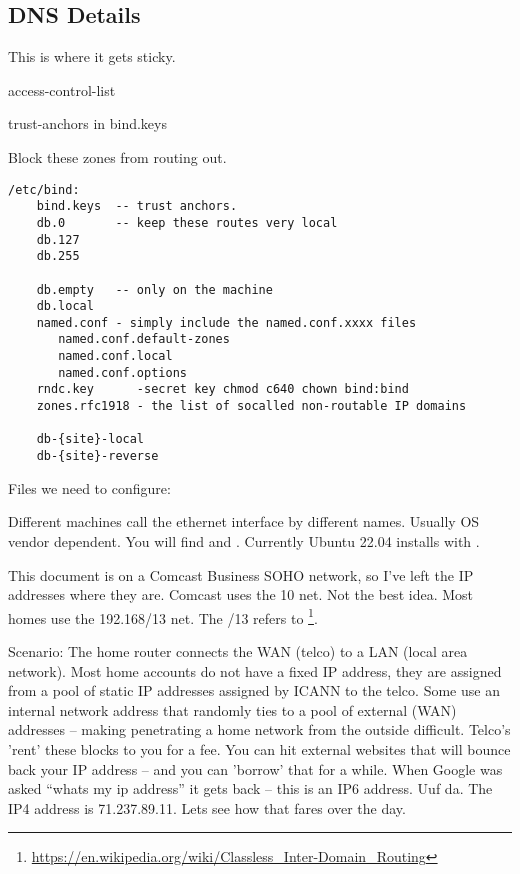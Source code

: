 \subsection{DNS Details}

This is where it gets sticky.

access-control-list

trust-anchors in bind.keys

Block these zones from routing out.

\begingroup \fontsize{10pt}{10pt}
\selectfont
\begin{verbatim} 
/etc/bind:
    bind.keys  -- trust anchors.
    db.0       -- keep these routes very local
    db.127
    db.255
    
    db.empty   -- only on the machine
    db.local
    named.conf - simply include the named.conf.xxxx files
       named.conf.default-zones
       named.conf.local
       named.conf.options
    rndc.key      -secret key chmod c640 chown bind:bind
    zones.rfc1918 - the list of socalled non-routable IP domains

    db-{site}-local
    db-{site}-reverse
\end{verbatim}
\endgroup

Files we need to configure:




Different machines call the ethernet interface by different
names. Usually OS vendor dependent. You will find  and
. Currently Ubuntu 22.04 installs with .

This document is on a Comcast Business SOHO network, so I've left the
IP addresses where they are. Comcast uses the 10 net. Not the best
idea.  Most homes use the 192.168/13 net. The /13 refers to \footnote{\url{https://en.wikipedia.org/wiki/Classless_Inter-Domain_Routing}}.

Scenario: The home router connects the WAN (telco) to a LAN (local area network).
Most home accounts do not have a fixed IP address, they are assigned from a pool
of static IP addresses assigned by ICANN to the telco. Some use an internal
network address that randomly ties to a pool of external (WAN) addresses -- making
penetrating a home network from the outside difficult. Telco's 'rent' these blocks
to you for a fee. You can hit external websites that will bounce back your IP
address -- and you can 'borrow' that for a while.
When Google was asked ``whats my ip address'' it gets
back  -- this is an IP6 address.
Uuf da. The IP4 address is 71.237.89.11. Lets see how that fares over the day.

